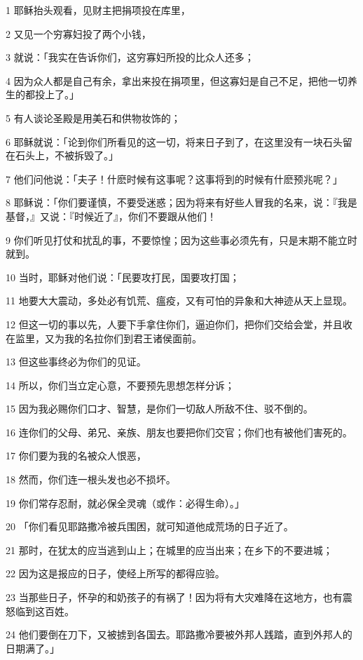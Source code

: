 \par 1 耶稣抬头观看，见财主把捐项投在库里，
\par 2 又见一个穷寡妇投了两个小钱，
\par 3 就说：「我实在告诉你们，这穷寡妇所投的比众人还多；
\par 4 因为众人都是自己有余，拿出来投在捐项里，但这寡妇是自己不足，把他一切养生的都投上了。」
\par 5 有人谈论圣殿是用美石和供物妆饰的；
\par 6 耶稣就说：「论到你们所看见的这一切，将来日子到了，在这里没有一块石头留在石头上，不被拆毁了。」
\par 7 他们问他说：「夫子！什麽时候有这事呢？这事将到的时候有什麽预兆呢？」
\par 8 耶稣说：「你们要谨慎，不要受迷惑；因为将来有好些人冒我的名来，说：『我是基督，』又说：『时候近了』，你们不要跟从他们！
\par 9 你们听见打仗和扰乱的事，不要惊惶；因为这些事必须先有，只是末期不能立时就到。
\par 10 当时，耶稣对他们说：「民要攻打民，国要攻打国；
\par 11 地要大大震动，多处必有饥荒、瘟疫，又有可怕的异象和大神迹从天上显现。
\par 12 但这一切的事以先，人要下手拿住你们，逼迫你们，把你们交给会堂，并且收在监里，又为我的名拉你们到君王诸侯面前。
\par 13 但这些事终必为你们的见证。
\par 14 所以，你们当立定心意，不要预先思想怎样分诉；
\par 15 因为我必赐你们口才、智慧，是你们一切敌人所敌不住、驳不倒的。
\par 16 连你们的父母、弟兄、亲族、朋友也要把你们交官；你们也有被他们害死的。
\par 17 你们要为我的名被众人恨恶，
\par 18 然而，你们连一根头发也必不损坏。
\par 19 你们常存忍耐，就必保全灵魂（或作：必得生命）。」
\par 20 「你们看见耶路撒冷被兵围困，就可知道他成荒场的日子近了。
\par 21 那时，在犹太的应当逃到山上；在城里的应当出来；在乡下的不要进城；
\par 22 因为这是报应的日子，使经上所写的都得应验。
\par 23 当那些日子，怀孕的和奶孩子的有祸了！因为将有大灾难降在这地方，也有震怒临到这百姓。
\par 24 他们要倒在刀下，又被掳到各国去。耶路撒冷要被外邦人践踏，直到外邦人的日期满了。」
